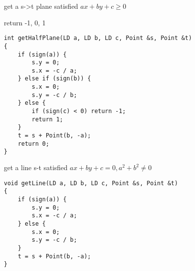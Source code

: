 get a s->t plane satisfied $ax + by + c \geq 0$

return {-1, 0, 1}
\begin{lstlisting}
int getHalfPlane(LD a, LD b, LD c, Point &s, Point &t)
{
	if (sign(a)) {
		s.y = 0;
		s.x = -c / a;
	} else if (sign(b)) {
		s.x = 0;
		s.y = -c / b;
	} else {
		if (sign(c) < 0) return -1;
		return 1;
	}
	t = s + Point(b, -a);
	return 0;
}
\end{lstlisting}

get a line s-t satisfied $ax + by + c = 0, a^2+b^2\neq 0$
\begin{lstlisting}
void getLine(LD a, LD b, LD c, Point &s, Point &t)
{
	if (sign(a)) {
		s.y = 0;
		s.x = -c / a;
	} else {
		s.x = 0;
		s.y = -c / b;
	}
	t = s + Point(b, -a);
}
\end{lstlisting}